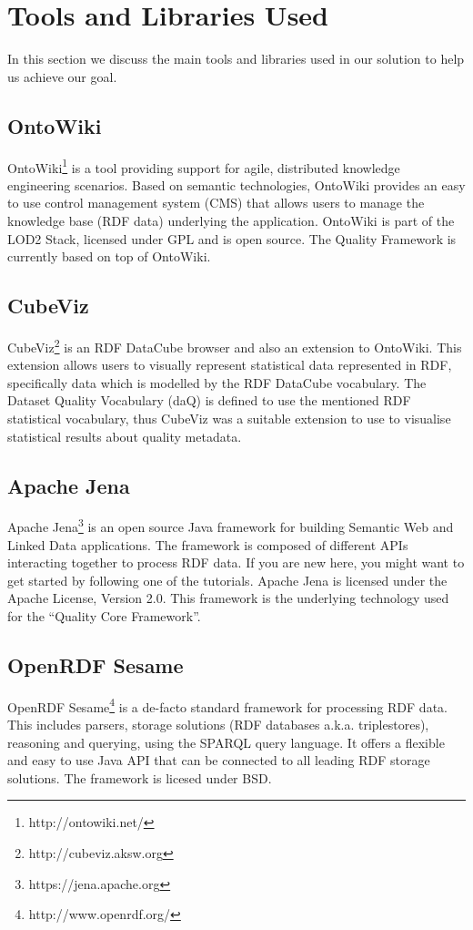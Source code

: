 
\section{Tools and Libraries Used}
\label{sec:Libraries} 

In this section we discuss the main tools and libraries used in our solution to help us achieve our goal.

\subsection{OntoWiki}
\label{sec:OntoWiki}
OntoWiki\footnote{http://ontowiki.net/} is a tool providing support for agile, distributed knowledge engineering scenarios.
Based on semantic technologies, OntoWiki provides an easy to use control management system (CMS) that allows users to manage the knowledge base (RDF data) underlying the application.
OntoWiki is part of the LOD2 Stack, licensed under GPL and is open source.
The Quality Framework is currently based on top of OntoWiki.

\subsection{CubeViz}
\label{sec:CubeViz}
CubeViz\footnote{http://cubeviz.aksw.org} is an RDF DataCube browser and also an extension to OntoWiki.
This extension allows users to visually represent statistical data represented in RDF, specifically data which is modelled by the RDF DataCube vocabulary.
The Dataset Quality Vocabulary (daQ) is defined to use the mentioned RDF statistical vocabulary, thus CubeViz was a suitable extension to use to visualise statistical results about quality metadata.


\subsection{Apache Jena}
\label{sec:Jena}
Apache Jena\footnote{https://jena.apache.org} is an open source Java framework for building Semantic Web and Linked Data applications.
The framework is composed of different APIs interacting together to process RDF data. If you are new here, you might want to get started by following one of the tutorials.
Apache Jena is licensed under the Apache License, Version 2.0. 
This framework is the underlying technology used for the ``Quality Core Framework''.

\subsection{OpenRDF Sesame}
\label{sec:Sesame}
OpenRDF Sesame\footnote{http://www.openrdf.org/} is  a de-facto standard framework for processing RDF data. 
This includes parsers, storage solutions (RDF databases a.k.a. triplestores), reasoning and querying, using the SPARQL query language. 
It offers a flexible and easy to use Java API that can be connected to all leading RDF storage solutions. 
The framework is licesed under BSD.


